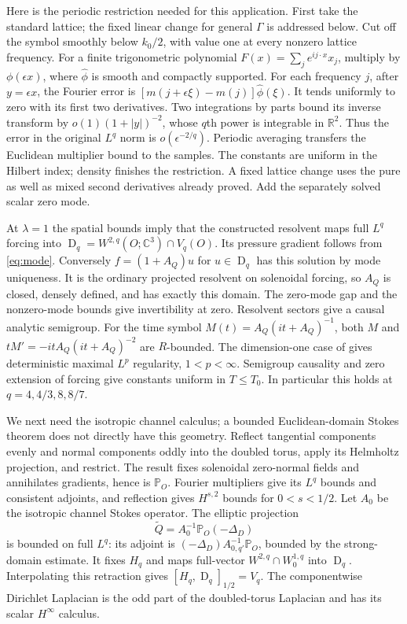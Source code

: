 \documentclass[11pt]{article}
\numberwithin{equation}{section}
\theoremstyle{remark}
\newcommand{\R}{\mathbb R}
\newcommand{\C}{\mathbb C}
\newcommand{\PP}{\mathbb P}
\DeclareMathOperator{\Dom}{D}
\begin{document}
Here is the periodic restriction needed for this application. First
take the standard lattice; the fixed linear change for general
$\Gamma$ is addressed below. Cut off
the symbol smoothly below $k_0/2$, with value one at every nonzero
lattice frequency. For a finite trigonometric polynomial
$F(x)=\sum_j e^{ij\cdot x}x_j$, multiply by $\phi(\epsilon x)$,
where $\widehat\phi$ is smooth and compactly supported. For each
frequency $j$, after $y=\epsilon x$, the Fourier error is
$[m(j+\epsilon\xi)-m(j)]\widehat\phi(\xi)$.
It tends uniformly to zero with its first two derivatives. Two
integrations by parts bound its inverse transform by
$o(1)(1+|y|)^{-2}$, whose $q$th power is integrable in $\R^2$.
Thus the error in the original $L^q$ norm is $o(\epsilon^{-2/q})$.
Periodic averaging transfers the Euclidean multiplier bound to the
samples. The constants are uniform in the Hilbert index; density
finishes the restriction. A fixed lattice change uses the pure as
well as mixed second derivatives already proved. Add the separately
solved scalar zero mode.

At $\lambda=1$ the spatial bounds imply that the constructed resolvent
maps full $L^q$ forcing into
$\Dom_q=W^{2,q}(O;\C^3)\cap V_q(O)$. Its pressure gradient follows
from \eqref{eq:mode}. Conversely $f=(1+A_Q)u$ for $u\in\Dom_q$
has this solution by mode uniqueness. It is the ordinary projected
resolvent on solenoidal forcing, so $A_Q$ is closed, densely defined,
and has exactly this domain. The zero-mode gap and the nonzero-mode
bounds give invertibility at zero. Resolvent sectors give a causal
analytic semigroup. For the time symbol
$M(t)=A_Q(it+A_Q)^{-1}$, both $M$ and
$tM'=-itA_Q(it+A_Q)^{-2}$ are $R$-bounded. The dimension-one case
of \cite[Corollary 4.4]{GW} gives deterministic maximal $L^p$
regularity, $1<p<\infty$. Semigroup causality and zero extension of
forcing give constants uniform in $T\leq T_0$. In particular this
holds at $q=4,4/3,8,8/7$.

We next need the isotropic channel calculus; a bounded Euclidean-domain
Stokes theorem does not directly have this geometry. Reflect tangential
components evenly and normal components oddly into the doubled torus,
apply its Helmholtz projection, and restrict. The result fixes
solenoidal zero-normal fields and annihilates gradients, hence is
$\PP_O$. Fourier multipliers give its $L^q$ bounds and consistent
adjoints, and reflection gives $H^{s,2}$ bounds for $0<s<1/2$.
Let $A_0$ be the isotropic channel Stokes operator. The elliptic
projection
\[
 \widetilde Q=A_0^{-1}\PP_O(-\Delta_D)
\]
is bounded on full $L^q$: its adjoint is
$(-\Delta_D)A_{0,q'}^{-1}\PP_O$, bounded by the strong-domain estimate.
It fixes $H_q$ and maps full-vector $W^{2,q}\cap W^{1,q}_0$ into
$\Dom_q$. Interpolating this retraction gives
$[H_q,\Dom_q]_{1/2}=V_q$. The componentwise Dirichlet Laplacian is
the odd part of the doubled-torus Laplacian and has its scalar
$H^\infty$ calculus.
\end{document}

